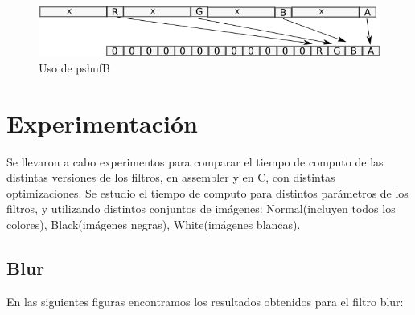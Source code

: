 \documentclass[a4paper]{article}
\begin{document}
\begin{figure}[H]
\centering
\includegraphics[scale=0.8]{imagenes/shufle.png}
\caption{Uso de pshufB}
\label{lshValue}
\end{figure}

\newpage


\section{Experimentación}

Se llevaron a cabo experimentos para comparar el tiempo de computo de las distintas versiones de los filtros, en assembler y en C, con distintas optimizaciones. Se estudio el tiempo de computo para distintos parámetros de los filtros, y utilizando distintos conjuntos de imágenes: Normal(incluyen todos los colores), Black(imágenes negras), White(imágenes blancas).


\subsection{Blur}

En las siguientes figuras encontramos los resultados obtenidos para el filtro blur:
\end{document}
